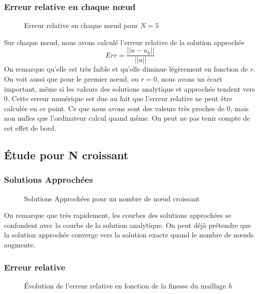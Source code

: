 \documentclass[a4paper,10pt]{report} %
\begin{document}
\subsubsection{Erreur relative en chaque nœud}
\begin{figure}[H]
\begin{center}
\end{center}
\caption{Erreur relative en chaque nœud pour $N=5$}
\label{Erreur relative N5}
\end{figure}


Sur chaque nœud, nous avons calculé l'erreur relative de la solution approchée  $$Err = \frac{||u-u_{h}||}{||u||}$$
On remarque qu'elle est très faible et qu'elle diminue légèrement en fonction de $r$. On voit aussi que pour le premier nœud, ou $r=0$, nous avons un écart important, même si les valeurs des solutions analytique et approchée tendent vers $0$. Cette erreur numérique est due au fait que l'erreur relative ne peut être calculée en ce point. Ce que nous avons sont des valeurs très proches de $0$, mais non nulles que l'ordinateur calcul quand même. On peut ne pas tenir compte de cet effet de bord.

\subsection{Étude pour N croissant}
\subsubsection{Solutions Approchées}
\begin{figure}[H]
\begin{center}
\end{center}
\caption{Solutions Approchées pour un nombre de nœud croissant}
\label{SANcroissant}
\end{figure}

On remarque que très rapidement, les courbes des solutions approchées se confondent avec la courbe de la solution analytique. On peut déjà prétendre que la solution approchée converge vers la solution exacte quand le nombre de nœuds augmente.

\subsubsection{Erreur relative}
\begin{figure}[H]
\begin{center}
\end{center}
\caption{Évolution de l'erreur relative en fonction de la finesse du maillage $h$}
\label{Erreur relative fct de h}
\end{figure}
\end{document}
